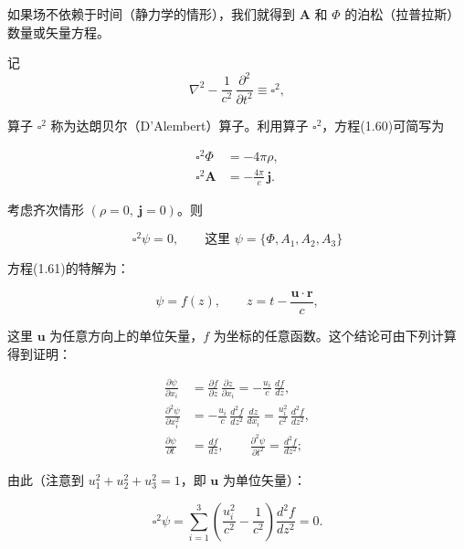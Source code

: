 \documentclass[11pt,a4paper,oneside]{ctexbook}
\newcommand{\ve}[1]{\bm{#1}}
\begin{document}
如果场不依赖于时间（静力学的情形），我们就得到 $\ve{A}$ 和 $\Phi$ 的泊松（拉普拉斯）数量或矢量方程。

记
\begin{equation*}
\nabla^{2} - \frac{1}{c^{2}}\, \frac{\partial^{2}}{\partial t^{2}} \equiv \square^{2},
\end{equation*}

算子 $\square^{2}$ 称为达朗贝尔（D'Alembert）算子。利用算子 $\square^{2}$，方程(1.60)可简写为

\begin{equation}
\begin{aligned}
\square^{2}\Phi &= -4\pi\rho,\\
\square^{2}\ve{A} &= -\frac{4\pi}{c}\, \ve{j}.
\end{aligned}
\tag{1.60a}
\end{equation}

考虑齐次情形 $(\rho = 0,\ \ve{j} = 0)$。则

\begin{equation}
\square^{2}\psi = 0, \qquad \text{这里 } \psi = \{\Phi, A_1, A_2, A_3\}
\tag{1.61}
\end{equation}

方程(1.61)的特解为：

\begin{equation*}
\psi = f(z), \qquad z = t - \frac{\ve{u} \cdot \ve{r}}{c},
\end{equation*}

这里 $\ve{u}$ 为任意方向上的单位矢量，$f$ 为坐标的任意函数。这个结论可由下列计算得到证明：

\begin{equation*}
\begin{aligned}
\frac{\partial\psi}{\partial x_i} &= \frac{\partial f}{\partial z}\, \frac{\partial z}{\partial x_i} = -\frac{u_i}{c}\, \frac{df}{dz},\\
\frac{\partial^{2}\psi}{\partial x_i^{2}} &= -\frac{u_i}{c}\, \frac{d^{2}f}{dz^{2}}\, \frac{dz}{dx_i} = \frac{u_i^{2}}{c^{2}}\, \frac{d^{2}f}{dz^{2}},\\
\frac{\partial\psi}{\partial t} &= \frac{df}{dz}, \qquad \frac{\partial^{2}\psi}{\partial t^{2}} = \frac{d^{2}f}{dz^{2}};
\end{aligned}
\end{equation*}

由此（注意到 $u_1^{2} + u_2^{2} + u_3^{2} = 1$，即 $\ve{u}$ 为单位矢量）：

\begin{equation}
\square^{2}\psi = \sum_{i=1}^{3} \left(\frac{u_i^{2}}{c^{2}} - \frac{1}{c^{2}}\right) \frac{d^{2}f}{dz^{2}} = 0.
\tag{1.61a}
\end{equation}
\end{document}
